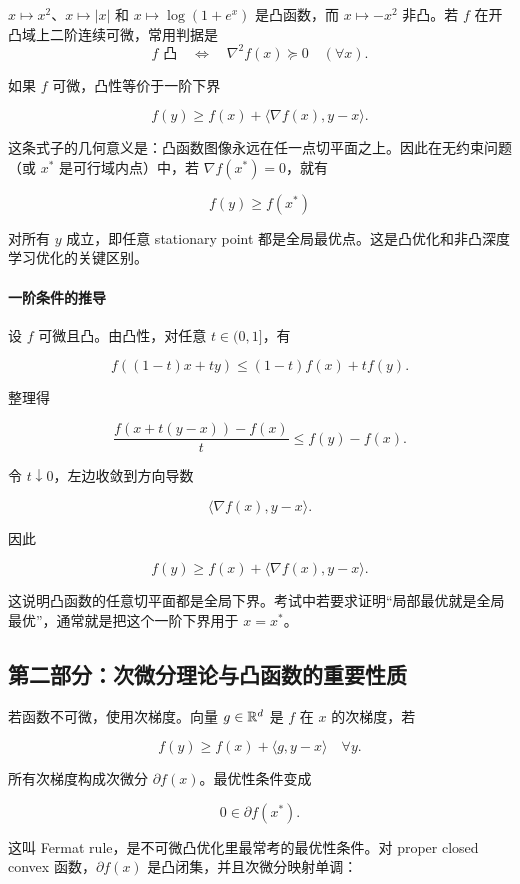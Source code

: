 \begin{example}[一维判断]
\(x\mapsto x^2\)、\(x\mapsto |x|\) 和 \(x\mapsto\log(1+e^x)\) 是凸函数，而 \(x\mapsto-x^2\) 非凸。若 \(f\) 在开凸域上二阶连续可微，常用判据是
\[
  f\text{ 凸}\quad\Longleftrightarrow\quad \nabla^2f(x)\succeq0\quad(\forall x).
\]
\end{example}

如果 \(f\) 可微，凸性等价于一阶下界

\[
  f(y)\ge f(x)+\langle \nabla f(x),y-x\rangle.
\]

这条式子的几何意义是：凸函数图像永远在任一点切平面之上。因此在无约束问题（或 \(x^*\) 是可行域内点）中，若 \(\nabla f(x^*)=0\)，就有

\[
  f(y)\ge f(x^*)
\]

对所有 \(y\) 成立，即任意 stationary point 都是全局最优点。这是凸优化和非凸深度学习优化的关键区别。

\paragraph{一阶条件的推导}

设 \(f\) 可微且凸。由凸性，对任意 \(t\in(0,1]\)，有

\[
  f((1-t)x+ty)
  \le
  (1-t)f(x)+tf(y).
\]

整理得

\[
  \frac{f(x+t(y-x))-f(x)}{t}
  \le
  f(y)-f(x).
\]

令 \(t\downarrow0\)，左边收敛到方向导数

\[
  \langle\nabla f(x),y-x\rangle.
\]

因此

\[
  f(y)\ge f(x)+\langle\nabla f(x),y-x\rangle.
\]

这说明凸函数的任意切平面都是全局下界。考试中若要求证明“局部最优就是全局最优”，通常就是把这个一阶下界用于 \(x=x^*\)。

\subsection{第二部分：次微分理论与凸函数的重要性质}

若函数不可微，使用次梯度。向量 \(g\in\mathbb{R}^d\) 是 \(f\) 在 \(x\) 的次梯度，若

\[
  f(y)\ge f(x)+\langle g,y-x\rangle
  \quad
  \forall y.
\]

所有次梯度构成次微分 \(\partial f(x)\)。最优性条件变成

\[
  0\in \partial f(x^*).
\]

这叫 Fermat rule，是不可微凸优化里最常考的最优性条件。对 proper closed convex 函数，\(\partial f(x)\) 是凸闭集，并且次微分映射单调：


